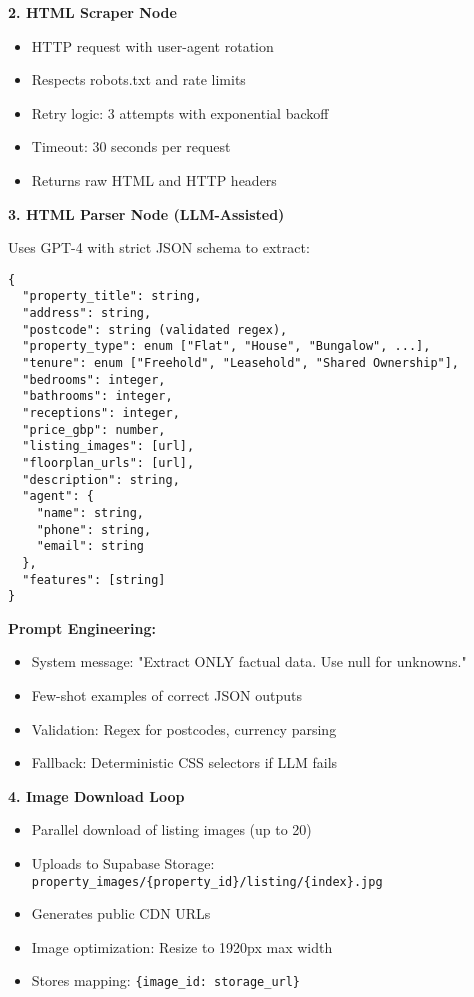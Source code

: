 \documentclass[11pt,a4paper]{article}
\begin{document}
\textbf{2. HTML Scraper Node}
\begin{itemize}
  \item HTTP request with user-agent rotation
  \item Respects robots.txt and rate limits
  \item Retry logic: 3 attempts with exponential backoff
  \item Timeout: 30 seconds per request
  \item Returns raw HTML and HTTP headers
\end{itemize}

\textbf{3. HTML Parser Node (LLM-Assisted)}

Uses GPT-4 with strict JSON schema to extract:

\begin{lstlisting}[caption=Property Extraction Schema]
{
  "property_title": string,
  "address": string,
  "postcode": string (validated regex),
  "property_type": enum ["Flat", "House", "Bungalow", ...],
  "tenure": enum ["Freehold", "Leasehold", "Shared Ownership"],
  "bedrooms": integer,
  "bathrooms": integer,
  "receptions": integer,
  "price_gbp": number,
  "listing_images": [url],
  "floorplan_urls": [url],
  "description": string,
  "agent": {
    "name": string,
    "phone": string,
    "email": string
  },
  "features": [string]
}
\end{lstlisting}

\textbf{Prompt Engineering:}
\begin{itemize}
  \item System message: "Extract ONLY factual data. Use null for unknowns."
  \item Few-shot examples of correct JSON outputs
  \item Validation: Regex for postcodes, currency parsing
  \item Fallback: Deterministic CSS selectors if LLM fails
\end{itemize}

\textbf{4. Image Download Loop}
\begin{itemize}
  \item Parallel download of listing images (up to 20)
  \item Uploads to Supabase Storage: \texttt{property\_images/\{property\_id\}/listing/\{index\}.jpg}
  \item Generates public CDN URLs
  \item Image optimization: Resize to 1920px max width
  \item Stores mapping: \texttt{\{image\_id: storage\_url\}}
\end{itemize}
\end{document}
